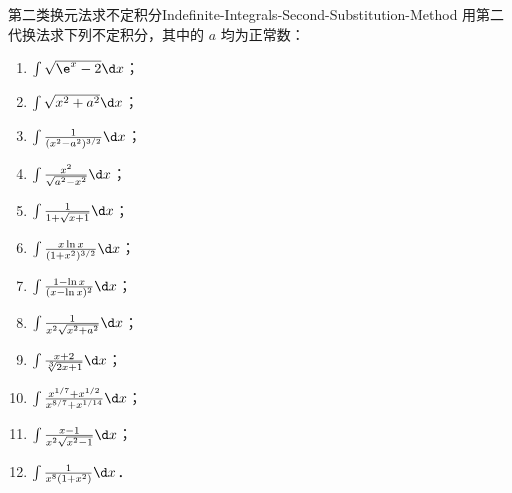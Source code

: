 \begin{problem}{第二类换元法求不定积分}{Indefinite-Integrals-Second-Substitution-Method}
    用第二代换法求下列不定积分，其中的 $a$ 均为正常数：
    \begin{enumerate}
        \item $\int \sqrt{\e^x - 2} \d x$；
        \item $\int \sqrt{x^2 + a^2} \d x$；
        \item $\int \frac{1}{(x^2 - a^2)^{3/2}} \d x$；
        \item $\int \frac{x^2}{\sqrt{a^2 - x^2}} \d x$；
        \item $\int \frac{1}{1 + \sqrt{x + 1}} \d x$；
        \item $\int \frac{x \ln x}{(1 + x^2)^{3/2}} \d x$；
        \item $\int \frac{1 - \ln x}{(x - \ln x)^2} \d x$；
        \item $\int \frac{1}{x^2 \sqrt{x^2 + a^2}} \d x$；
        \item $\int \frac{x + 2}{\sqrt[3]{2x + 1}} \d x$；
        \item $\int \frac{x^{1/7} + x^{1/2}}{x^{8/7} + x^{1/14}} \d x$；
        \item $\int \frac{x - 1}{x^2 \sqrt{x^2 - 1}} \d x$；
        \item $\int \frac{1}{x^8 (1 + x^2)} \d x$．
    \end{enumerate}
\end{problem}


